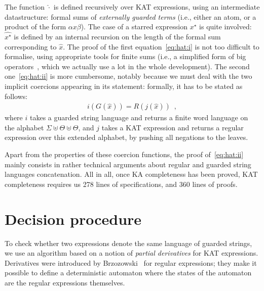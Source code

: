 \documentclass[a4paper]{llncs}
\newif\iflong\longfalse
\begin{document}
The function $\hat\cdot$ is defined recursively over KAT expressions,
using an intermediate datastructure: formal sums of \emph{externally
  guarded terms} (i.e., either an atom, or a product of the form
$\alpha x \beta$). The case of a starred expression $x^\star$ is quite
involved: $\hat{x^\star}$ is defined by an internal recursion on the
length of the formal sum corresponding to $\hat x$.
The proof of the first equation~\eqref{eq:hat:i} is not too difficult
to formalise, using appropriate tools for finite sums (i.e., a
simplified form of big operators~\cite{BertotGBP08}, which we actually
use a lot in the whole development). The second one~\eqref{eq:hat:ii}
is more cumbersome, notably because we must deal with the two implicit
coercions appearing in its statement: formally, it has to be stated as
follows:
\begin{align*}
  i(G(\hat x)) = R(j(\hat x))\enspace, \end{align*}
where $i$ takes a guarded string language and returns a finite word
language on the alphabet $\Sigma\uplus\Theta\uplus\Theta$, and $j$
takes a KAT expression and returns a regular expression over this
extended alphabet, by pushing all negations to the leaves.

\iflong
The function $j$ is defined by pushing all negations to the leaves
using de Morgan laws, and interpreting conjunction, disjunction, top
element, and bottom element as product, sums, unit, and zero,
respectively.
The function $i$ is harder to describe succinctly; on an example,
assuming that $\Theta$ has three elements, if $\alpha=\set{a_1,a_3}$
and $\beta=\set{a_2,a_3}$, the guarded string $\alpha p \beta q \beta$
is interpreted as the word
$a_1^+a_2^-a_3^+pa_1^-a_2^+a_3^+qa_1^-a_2^+a_3^+$ (where $a_i^-$
denotes a letter in the first copy of $\Theta$ while $a_i^+$ denotes
the same element in the second copy).
\fi

Apart from the properties of these coercion functions, the proof
of~\eqref{eq:hat:ii} mainly consists in rather technical arguments
about regular and guarded string languages concatenation.
All in all, once KA completeness has been proved, KAT completeness
requires us 278 lines of specifications, and 360 lines of proofs.

\section{Decision procedure}
\label{sec:decision}

To check whether two expressions denote the same language of guarded
strings, we use an algorithm based on a notion of \emph{partial
  derivatives} for KAT expressions.
Derivatives were introduced by Brzozowski~\cite{Brzozowski64} for
regular expressions; they make it possible to define a deterministic
automaton where the states of the automaton are the regular
expressions themselves. 
\end{document}
